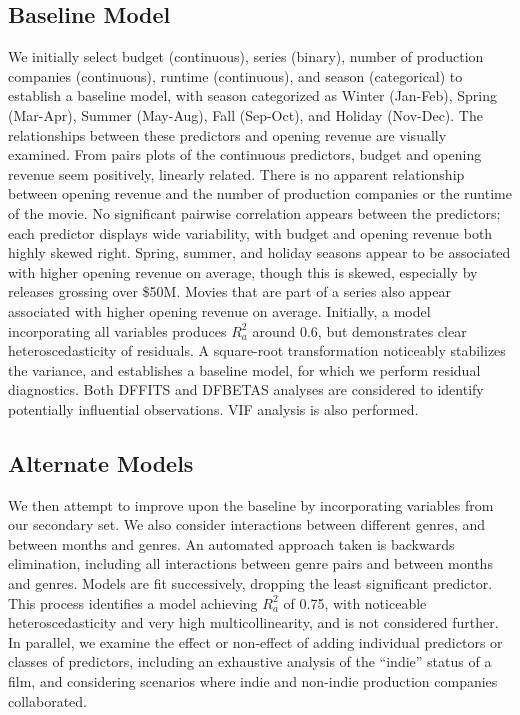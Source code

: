 \documentclass[10pt]{article}
\begin{document}
\subsection{Baseline Model}
We initially select budget (continuous), series (binary), number of production companies (continuous), runtime (continuous), and season (categorical) to establish a baseline model, with season categorized as Winter (Jan-Feb), Spring (Mar-Apr), Summer (May-Aug), Fall (Sep-Oct), and Holiday (Nov-Dec). The relationships between these predictors and opening revenue are visually examined. From pairs plots of the continuous predictors, budget and opening revenue seem positively, linearly related. There is no apparent relationship between opening revenue and the number of production companies or the runtime of the movie. No significant pairwise correlation appears between the predictors; each predictor displays wide variability, with budget and opening revenue both highly skewed right. Spring, summer, and holiday seasons appear to be associated with higher opening revenue on average, though this is skewed, especially by releases grossing over \$50M. Movies that are part of a series also appear associated with higher opening revenue on average. Initially, a model incorporating all variables produces $R^2_a$ around 0.6, but demonstrates clear heteroscedasticity of residuals. A square-root transformation noticeably stabilizes the variance, and establishes a baseline model, for which we perform residual diagnostics. Both DFFITS and DFBETAS analyses are considered to identify potentially influential observations. VIF analysis is also performed. 

\subsection{Alternate Models}
We then attempt to improve upon the baseline by incorporating variables from our secondary set. We also consider interactions between different genres, and between months and genres. An automated approach taken is backwards elimination, including all interactions between genre pairs and between months and genres. Models are fit successively, dropping the least significant predictor. This process identifies a model achieving $R^2_a$ of 0.75, with noticeable heteroscedasticity and very high multicollinearity, and is not considered further. In parallel, we examine the effect or non-effect of adding individual predictors or classes of predictors, including an exhaustive analysis of the “indie” status of a film, and considering scenarios where indie and non-indie production companies collaborated.
\end{document}
